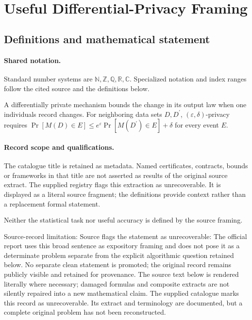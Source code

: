 \documentclass[11pt]{article}
\begin{document}
\section{Useful Differential-Privacy Framing}\label{statement}

\subsection{Definitions and mathematical statement}

\paragraph{Shared notation.}Standard number systems are $\mathbb N,\mathbb Z,\mathbb Q,\mathbb R,\mathbb C$. Specialized notation and index ranges follow the cited source and the definitions below.


A differentially private mechanism bounds the change in its output law when one individual\textquotesingle s record changes. For neighboring data sets $D,D^{\prime}$, $(\varepsilon,\delta)$-privacy requires $\Pr[M(D)\in E]\leq e^\varepsilon\Pr[M(D^{\prime})\in E]+\delta$ for every event $E$.
\paragraph{Record scope and qualifications.}
The catalogue title is retained as metadata. Named certificates, contracts, bounds or frameworks in that title are not asserted as results of the original source extract.
The supplied registry flags this extraction as unrecoverable. It is displayed as a literal source fragment; the definitions provide context rather than a replacement formal statement.

Neither the statistical task nor useful accuracy is defined by the source framing.

Source-record limitation: Source flags the statement as unrecoverable: The official report uses this broad sentence as expository framing and does not pose it as a determinate problem separate from the explicit algorithmic question retained below. No separate clean statement is promoted; the original record remains publicly visible and retained for provenance.
The source text below is rendered literally where necessary; damaged formulas and composite extracts are not silently repaired into a new mathematical claim.
The supplied catalogue marks this record as unrecoverable. Its extract and terminology are documented, but a complete original problem has not been reconstructed.
\end{document}
